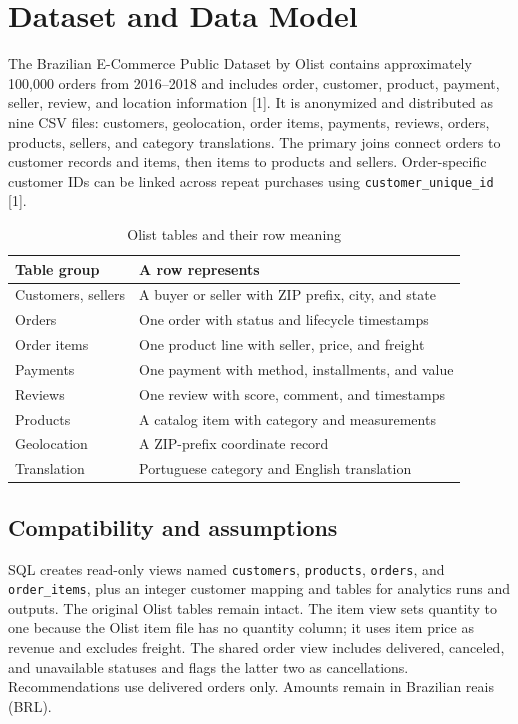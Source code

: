 \documentclass[conference]{IEEEtran}
\begin{document}
\section{Dataset and Data Model}
The Brazilian E-Commerce Public Dataset by Olist contains approximately 100,000 orders from 2016--2018 and includes order, customer, product, payment, seller, review, and location information [1]. It is anonymized and distributed as nine CSV files: customers, geolocation, order items, payments, reviews, orders, products, sellers, and category translations. The primary joins connect orders to customer records and items, then items to products and sellers. Order-specific customer IDs can be linked across repeat purchases using \texttt{customer\_unique\_id} [1].
\begin{table}[t]
\caption{Olist tables and their row meaning}
\centering\footnotesize
\begin{tabular}{p{} p{}}
\toprule
\textbf{Table group} & \textbf{A row represents}\\
\midrule
Customers, sellers & A buyer or seller with ZIP prefix, city, and state\\
Orders & One order with status and lifecycle timestamps\\
Order items & One product line with seller, price, and freight\\
Payments & One payment with method, installments, and value\\
Reviews & One review with score, comment, and timestamps\\
Products & A catalog item with category and measurements\\
Geolocation & A ZIP-prefix coordinate record\\
Translation & Portuguese category and English translation\\
\bottomrule
\end{tabular}
\end{table}
\subsection{Compatibility and assumptions}
SQL creates read-only views named \texttt{customers}, \texttt{products}, \texttt{orders}, and \texttt{order\_items}, plus an integer customer mapping and tables for analytics runs and outputs. The original Olist tables remain intact. The item view sets quantity to one because the Olist item file has no quantity column; it uses item price as revenue and excludes freight. The shared order view includes delivered, canceled, and unavailable statuses and flags the latter two as cancellations. Recommendations use delivered orders only. Amounts remain in Brazilian reais (BRL).
\end{document}
